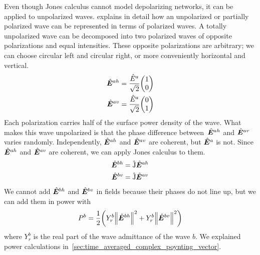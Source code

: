 Even though Jones calculus cannot model depolarizing networks, it can be applied to unpolarized waves.
\textcite{goodman1985statistical} explains in detail how an unpolarized or partially polarized wave can be represented in terms of polarized waves.
A totally unpolarized wave can be decomposed into two polarized waves of opposite polarizations and equal intensities.
These opposite polarizations are arbitrary; we can choose circular left and circular right, or more conveniently horizontal and vertical.
\begin{equation}
    \begin{aligned}
        \vectcp{E}^{ah}
        &=
        \frac{\cp{E}^a}{\sqrt{2}}
        \begin{pmatrix}
            1 \\ 0
        \end{pmatrix}
        \\
        \vectcp{E}^{av}
        &=
        \frac{\cp{E}^a}{\sqrt{2}}
        \begin{pmatrix}
            0 \\ 1
        \end{pmatrix}
    \end{aligned}
\end{equation}
Each polarization carries half of the surface power density of the wave.
What makes this wave unpolarized is that the phase difference between~$\hat{\bm{E}}^{ah}$ and $\hat{\bm{E}}^{av}$ varies randomly.
Independently, $\hat{\bm{E}}^{ah}$ and $\hat{\bm{E}}^{av}$ are coherent, but $\hat{\bm{E}}^a$ is not.
Since $\hat{\bm{E}}^{ah}$ and $\hat{\bm{E}}^{av}$ are coherent, we can apply Jones calculus to them.
\begin{equation}
    \begin{aligned}
        \hat{\bm{E}}^{bh}
        &=
        \hat{\mathrm{J}}
        \hat{\bm{E}}^{ah}
        \\
        \hat{\bm{E}}^{bv}
        &=
        \hat{\mathrm{J}}
        \hat{\bm{E}}^{av}
    \end{aligned}
\end{equation}
We cannot add $\hat{\bm{E}}^{bh}$ and $\hat{\bm{E}}^{bv}$ in fields because their phases do not line up, but we can add them in power with
\begin{equation}
    P^b
    =
    \frac{1}{2}
    \left(
        Y^b_r \norm{\vectcp{E}^{bh}}^2 + Y^b_r \norm{\vectcp{E}^{bv}}^2
    \right)
\end{equation}
where $Y^b_r$ is the real part of the wave admittance of the wave $b$.
We explained power calculations in~\cref{sec:time_averaged_complex_poynting_vector}.


